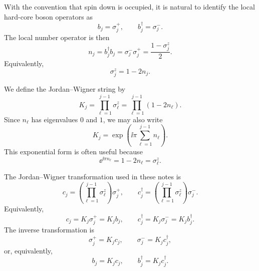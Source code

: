 With the convention that spin down is occupied, it is natural to identify the local
hard-core boson operators as
\begin{equation}
    b_j=\sigma_j^+,
    \qquad
    b_j^\dagger=\sigma_j^- .
\end{equation}
The local number operator is then
\begin{equation}
    n_j
    =
    b_j^\dagger b_j
    =
    \sigma_j^-\sigma_j^+
    =
    \frac{1-\sigma_j^z}{2}.
\end{equation}
Equivalently,
\begin{equation}
    \sigma_j^z = 1-2n_j.
\end{equation}

We define the Jordan--Wigner string by
\begin{equation}
\label{eq:jw-string-definition}
    K_j
    =
    \prod_{\ell=1}^{j-1}\sigma_\ell^z
    =
    \prod_{\ell=1}^{j-1}(1-2n_\ell).
\end{equation}
Since \(n_\ell\) has eigenvalues \(0\) and \(1\), we may also write
\begin{equation}
    K_j
    =
    \exp\!\left(
        \ii\pi\sum_{\ell=1}^{j-1}n_\ell
    \right).
\end{equation}
This exponential form is often useful because
\begin{equation}
    \ee^{\ii\pi n_\ell}=1-2n_\ell=\sigma_\ell^z.
\end{equation}

The Jordan--Wigner transformation used in these notes is
\begin{equation}
\label{eq:jw-definition-product}
    c_j
    =
    \left(\prod_{\ell=1}^{j-1}\sigma_\ell^z\right)\sigma_j^+,
    \qquad
    c_j^\dagger
    =
    \left(\prod_{\ell=1}^{j-1}\sigma_\ell^z\right)\sigma_j^- .
\end{equation}
Equivalently,
\begin{equation}
\label{eq:jw-definition-compact}
    c_j = K_j\sigma_j^+ = K_j b_j,
    \qquad
    c_j^\dagger = K_j\sigma_j^- = K_j b_j^\dagger .
\end{equation}
The inverse transformation is
\begin{equation}
\label{eq:jw-inverse}
    \sigma_j^+ = K_j c_j,
    \qquad
    \sigma_j^- = K_j c_j^\dagger,
\end{equation}
or, equivalently,
\begin{equation}
    b_j=K_jc_j,
    \qquad
    b_j^\dagger=K_jc_j^\dagger .
\end{equation}

